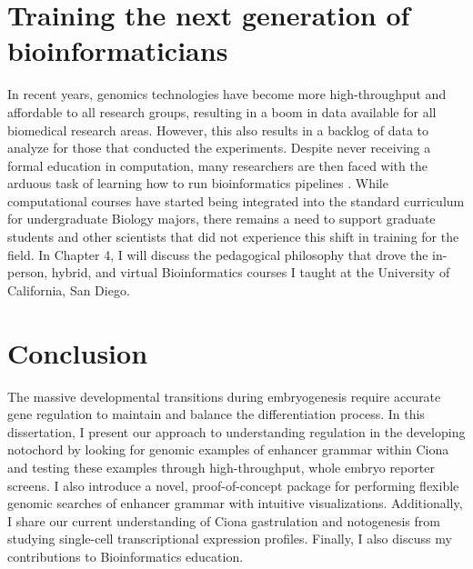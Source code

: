 \begin{dissertationintroduction}
    \section{Training the next generation of bioinformaticians}
    In recent years, genomics technologies have become more high-throughput and affordable to all research groups, resulting in a boom in data available for all biomedical research areas. However, this also results in a backlog of data to analyze for those that conducted the experiments. Despite never receiving a formal education in computation, many researchers are then faced with the arduous task of learning how to run bioinformatics pipelines \cite{barone2017, stephens2015}. While computational courses have started being integrated into the standard curriculum for undergraduate Biology majors, there remains a need to support graduate students and other scientists that did not experience this shift in training for the field. In Chapter 4, I will discuss the pedagogical philosophy that drove the in-person, hybrid, and virtual Bioinformatics courses I taught at the University of California, San Diego. 

    \section{Conclusion}
    The massive developmental transitions during embryogenesis require accurate gene regulation to maintain and balance the differentiation process. In this dissertation, I present our approach to understanding regulation in the developing notochord by looking for genomic examples of enhancer grammar within Ciona and testing these examples through high-throughput, whole embryo reporter screens. I also introduce a novel, proof-of-concept package for performing flexible genomic searches of enhancer grammar with intuitive visualizations. Additionally, I share our current understanding of Ciona gastrulation and notogenesis from studying single-cell transcriptional expression profiles. Finally, I also discuss my contributions to Bioinformatics education.
    
\end{dissertationintroduction}
